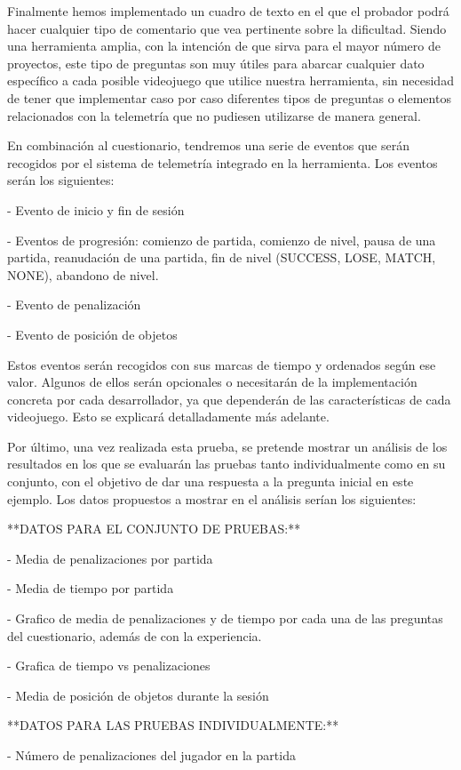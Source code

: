 Finalmente hemos implementado un cuadro de texto en el que el probador podrá hacer cualquier tipo de comentario que vea pertinente sobre la dificultad. Siendo una herramienta amplia, con la intención de que sirva para el mayor número de proyectos, este tipo de preguntas son muy útiles para abarcar cualquier dato específico a cada posible videojuego que utilice nuestra herramienta, sin necesidad de tener que implementar caso por caso diferentes tipos de preguntas o elementos relacionados con la telemetría que no pudiesen utilizarse de manera general.


En combinación al cuestionario, tendremos una serie de eventos que serán recogidos por el sistema de telemetría integrado en la herramienta. Los eventos serán los siguientes:


- Evento de inicio y fin de sesión

- Eventos de progresión: comienzo de partida, comienzo de nivel, pausa de una partida, reanudación de una partida, fin de nivel (SUCCESS, LOSE, MATCH, NONE), abandono de nivel.

- Evento de penalización

- Evento de posición de objetos


Estos eventos serán recogidos con sus marcas de tiempo y ordenados según ese valor. Algunos de ellos serán opcionales o necesitarán de la implementación concreta por cada desarrollador, ya que dependerán de las características de cada videojuego. Esto se explicará detalladamente más adelante.


Por último, una vez realizada esta prueba, se pretende mostrar un análisis de los resultados en los que se evaluarán las pruebas tanto individualmente como en su conjunto, con el objetivo de dar una respuesta a la pregunta inicial en este ejemplo. Los datos propuestos a mostrar en el análisis serían los siguientes:


**DATOS PARA EL CONJUNTO DE PRUEBAS:**

- Media de penalizaciones por partida

- Media de tiempo por partida

- Grafico de media de penalizaciones y de tiempo por cada una de las preguntas del cuestionario, además de con la experiencia.

- Grafica de tiempo vs penalizaciones

- Media de posición de objetos durante la sesión


**DATOS PARA LAS PRUEBAS INDIVIDUALMENTE:**

- Número de penalizaciones del jugador en la partida

